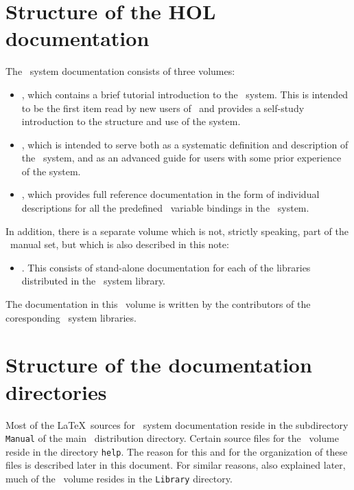 \section{Structure of the HOL documentation}

The \HOL\ system documentation consists of three volumes:

\begin{itemize}

\item \TUTORIAL, which contains a brief tutorial introduction to the \HOL\
system. This is intended to be the first item read by new users of \HOL\ and
provides a self-study introduction to the structure and use of the system.

\item \DESCRIPTION, which is intended to serve both as a systematic definition
and description of the \HOL\ system, and as an advanced guide for users with
some prior experience of the system.

\item \REFERENCE, which provides full reference documentation in the form of
individual descriptions for all the predefined \ML\ variable bindings in the
\HOL\ system.

\end{itemize}

\noindent In addition, there is a separate volume which is not, strictly
speaking, part of the \HOL\ manual set, but which is also described in this
note:

\begin{itemize}

\item \LIBRARIES. This consists of stand-alone documentation for each of the
libraries distributed in the \HOL\ system library.

\end{itemize}

\noindent The documentation in this \LIBRARIES\ volume is written by the
contributors of the coresponding \HOL\ system libraries.

\section{Structure of the documentation directories}

Most of the \LaTeX\ sources for \HOL\ system documentation reside in the
subdirectory {\tt Manual} of the main \HOL\ distribution directory.  Certain
source files for the \REFERENCE\ volume reside in the directory {\tt help}. The
reason for this and for the organization of these files is described later in
this document.  For similar reasons, also explained later, much of the
\LIBRARIES\ volume resides in the {\tt Library} directory.

